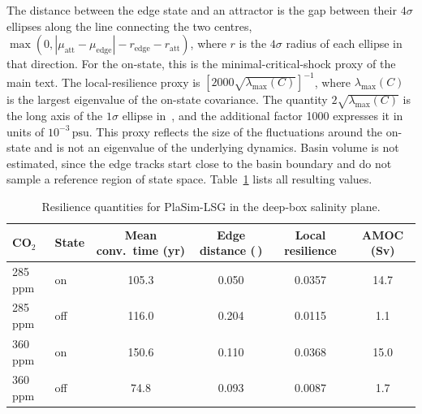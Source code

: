\documentclass[12pt, a4paper]{article}
\newcommand{\psu}{\,\text{psu}}
\newcommand{\CO}{CO\ensuremath{_2}}
\begin{document}
The distance between the edge state and an attractor is the gap between their $4\sigma$ ellipses along the line connecting the two centres, $\max(0,|\mu_{\mathrm{att}}-\mu_{\mathrm{edge}}|-r_{\mathrm{edge}}-r_{\mathrm{att}})$, where $r$ is the $4\sigma$ radius of each ellipse in that direction. For the on-state, this is the minimal-critical-shock proxy of the main text. The local-resilience proxy is $[2000\sqrt{\lambda_{\max}(C)}]^{-1}$, where $\lambda_{\max}(C)$ is the largest eigenvalue of the on-state covariance. The quantity $2\sqrt{\lambda_{\max}(C)}$ is the long axis of the $1\sigma$ ellipse in \psu{}, and the additional factor 1000 expresses it in units of $10^{-3}\psu{}$. This proxy reflects the size of the fluctuations around the on-state and is not an eigenvalue of the underlying dynamics. Basin volume is not estimated, since the edge tracks start close to the basin boundary and do not sample a reference region of state space. Table~\ref{tab:plasim-results} lists all resulting values.

\begin{table}[t]
  \centering
  \caption{Resilience quantities for PlaSim-LSG in the deep-box salinity plane.}
  \label{tab:plasim-results}
  \small
  \setlength{\tabcolsep}{4pt}
  \begin{tabular}{llcccc}
    \toprule
    \CO{} & State & Mean conv.\ time (yr) & Edge distance (\psu{}) & Local resilience & AMOC (Sv) \\
    \midrule
    285 ppm & on  & 105.3 & 0.050 & 0.0357 & 14.7 \\
    285 ppm & off & 116.0 & 0.204 & 0.0115 & 1.1 \\
    360 ppm & on  & 150.6 & 0.110 & 0.0368 & 15.0 \\
    360 ppm & off & 74.8  & 0.093 & 0.0087 & 1.7 \\
    \bottomrule
  \end{tabular}
\end{table}




\end{document}
